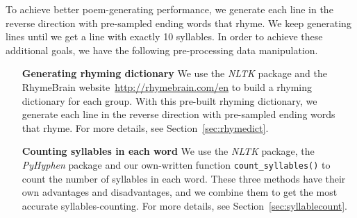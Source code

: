 To achieve better poem-generating performance, we generate each line in the reverse direction with pre-sampled ending words that rhyme. We keep generating lines until we get a line with exactly 10 syllables. In order to achieve these additional goals, we have the following pre-processing data manipulation.
\begin{enumerate}
	\item [\textbf{Generating rhyming dictionary}] We use the \textit{NLTK} package and the RhymeBrain website~\url{http://rhymebrain.com/en} to build a rhyming dictionary for each group. With this pre-built rhyming dictionary,  we generate each line in the reverse direction with pre-sampled ending words that rhyme. For more details, see Section~\ref{sec:rhymedict}.
	\item [\textbf{Counting syllables in each word}] We use the \textit{NLTK} package, the \textit{PyHyphen} package and our own-written function \texttt{count\_syllables()} to count the number of syllables in each word. These three methods have their own advantages and disadvantages, and we combine them to get the most accurate syllables-counting. For more details, see Section~\ref{sec:syllablecount}.
\end{enumerate}
